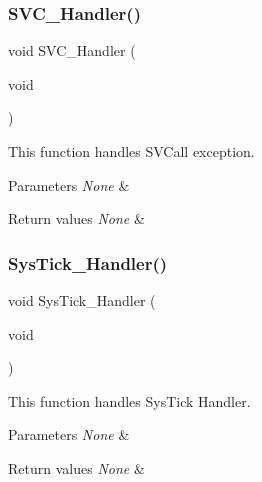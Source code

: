 \subsubsection{\texorpdfstring{S\+V\+C\+\_\+\+Handler()}{SVC\_Handler()}}
{\footnotesize\ttfamily void S\+V\+C\+\_\+\+Handler (\begin{DoxyParamCaption}\item[{void}]{ }\end{DoxyParamCaption})}



This function handles S\+V\+Call exception. 


\begin{DoxyParams}{Parameters}
{\em None} & \\
\hline
\end{DoxyParams}

\begin{DoxyRetVals}{Return values}
{\em None} & \\
\hline
\end{DoxyRetVals}
\mbox{\label{group___templates_gab5e09814056d617c521549e542639b7e}} 
\subsubsection{\texorpdfstring{Sys\+Tick\+\_\+\+Handler()}{SysTick\_Handler()}}
{\footnotesize\ttfamily void Sys\+Tick\+\_\+\+Handler (\begin{DoxyParamCaption}\item[{void}]{ }\end{DoxyParamCaption})}



This function handles Sys\+Tick Handler. 


\begin{DoxyParams}{Parameters}
{\em None} & \\
\hline
\end{DoxyParams}

\begin{DoxyRetVals}{Return values}
{\em None} & \\
\hline
\end{DoxyRetVals}
\mbox{\label{group___templates_ga1d98923de2ed6b7309b66f9ba2971647}} 

